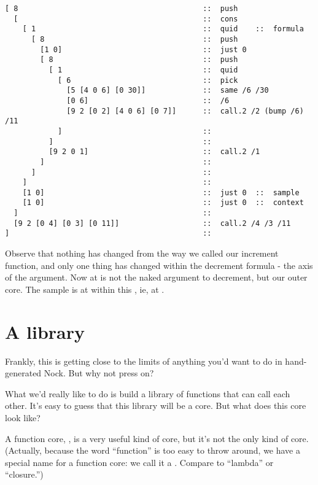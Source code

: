 \begin{framed_shaded}
\begin{Verbatim}[fontsize=\relsize{-2.5},commandchars=\\\{\}]
[ 8                                          ::  push
  [                                          ::  cons
    [ 1                                      ::  quid    ::  formula
      [ 8                                    ::  push
        [1 0]                                ::  just 0
        [ 8                                  ::  push
          [ 1                                ::  quid
            [ 6                              ::  pick
              [5 [4 0 6] [0 30]]             ::  same /6 /30
              [0 6]                          ::  /6
              [9 2 [0 2] [4 0 6] [0 7]]      ::  call.2 /2 (bump /6) /11
            ]                                ::
          ]                                  ::
          [9 2 0 1]                          ::  call.2 /1
        ]                                    ::
      ]                                      ::
    ]                                        ::
    [1 0]                                    ::  just 0  ::  sample
    [1 0]                                    ::  just 0  ::  context
  ]                                          ::
  [9 2 [0 4] [0 3] [0 11]]                   ::  call.2 /4 /3 /11
]                                            ::
\end{Verbatim}
\end{framed_shaded}
Observe that nothing has changed from the way we called our
increment function, and only one thing has changed within the
decrement formula - the axis of the argument.  Now at  is not
the naked argument to decrement, but our outer core.  The sample
is at  within this , ie, at .

\section{A library}

Frankly, this is getting close to the limits of anything you'd
want to do in hand-generated Nock.  But why not press on?

What we'd really like to do is build a library of functions that
can call each other.  It's easy to guess that this library will
be a core.  But what does this core look like?

A function core, , is a very useful
kind of core, but it's not the only kind of core.  (Actually,
because the word ``function'' is too easy to throw around, we have
a special name for a function core: we call it a .  Compare
to ``lambda'' or ``closure.'')

